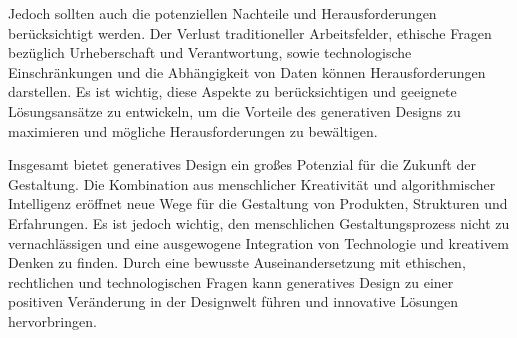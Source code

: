  Jedoch sollten auch die potenziellen Nachteile und Herausforderungen berücksichtigt werden. Der Verlust traditioneller Arbeitsfelder, ethische Fragen bezüglich Urheberschaft und Verantwortung, sowie technologische Einschränkungen und die Abhängigkeit von Daten können Herausforderungen darstellen. Es ist wichtig, diese Aspekte zu berücksichtigen und geeignete Lösungsansätze zu entwickeln, um die Vorteile des generativen Designs zu maximieren und mögliche Herausforderungen zu bewältigen.
 
 Insgesamt bietet generatives Design ein großes Potenzial für die Zukunft der Gestaltung. Die Kombination aus menschlicher Kreativität und algorithmischer Intelligenz eröffnet neue Wege für die Gestaltung von Produkten, Strukturen und Erfahrungen. Es ist jedoch wichtig, den menschlichen Gestaltungsprozess nicht zu vernachlässigen und eine ausgewogene Integration von Technologie und kreativem Denken zu finden. Durch eine bewusste Auseinandersetzung mit ethischen, rechtlichen und technologischen Fragen kann generatives Design zu einer positiven Veränderung in der Designwelt führen und innovative Lösungen hervorbringen.